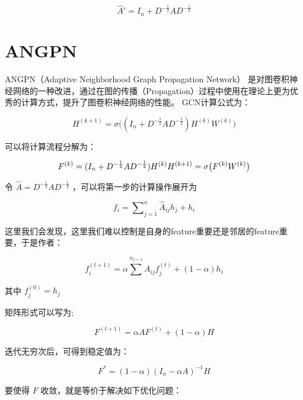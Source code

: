 \documentclass[color=gray,base=hide,cn]{elegantbook}
\begin{document}
\begin{equation}
\hat{A}' = {I_n}+{D}^{-\frac{1}{2}}{A}{D}^{-\frac{1}{2}}
\end{equation}

\section{ANGPN}
ANGPN（Adaptive Neighborhood Graph Propagation Network） \cite{Jiang2019SemisupervisedLW}是对图卷积神经网络的一种改进，通过在图的传播（Propagation）过程中使用在理论上更为优秀的计算方式，提升了图卷积神经网络的性能。
GCN计算公式为：

\begin{equation}
{H}^{(k+1)} = \sigma\big(({I_n}+{D}^{-\frac{1}{2}}{A}{D}^{-\frac{1}{2}}){H}^{(k)}{W}^{(k)}\big)
\end{equation}

可以将计算流程分解为：

\begin{equation}
{F}^{(k)} = ({I_n}+{D}^{-\frac{1}{2}}{A}{D}^{-\frac{1}{2}}){H}^{(k)} \\ {H}^{(k+1)} = \sigma\big( {F}^{(k)}  {W}^{(k)}\big)
\end{equation}

令 $\hat{{A}} = {D}^{-\frac{1}{2}}{A}{D}^{-\frac{1}{2}}$ ，可以将第一步的计算操作展开为

\begin{equation}
{f}_i = \sum\nolimits^n_{j=1}\hat{{A}}_{ij}{h}_j  +{h}_i
\end{equation}

这里我们会发现，这里我们难以控制是自身的feature重要还是邻居的feature重要，于是作者：

\begin{equation}
{f}_i^{(t+1)} = \alpha \sum^n\nolimits_{j=1}{A}_{ij} {f}_j^{(t)} + (1-\alpha){h}_i
\end{equation}

其中 $f^{(0)}_j = h_j$

矩阵形式可以写为;

\begin{equation}
{F}^{(t+1)} = \alpha {A} {F}^{(t)} + (1-\alpha){H}
\end{equation}

迭代无穷次后，可得到稳定值为：

\begin{equation}
{F}^{*} = (1-\alpha) (I_n - \alpha A)^{-1}{H}
\end{equation}

要使得 $F$ 收敛，就是等价于解决如下优化问题：
\end{document}
